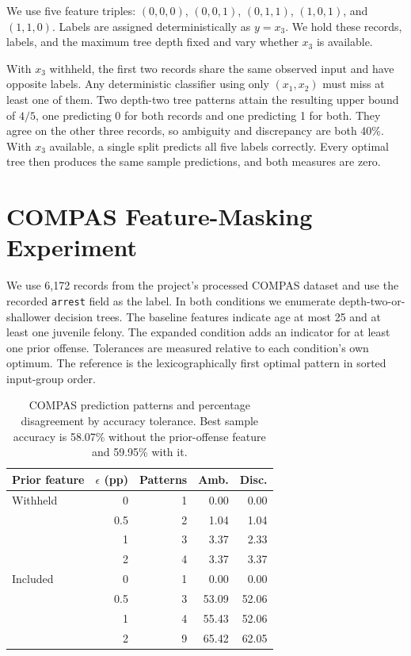 \documentclass{article}
\begin{document}
We use five feature triples: \((0,0,0)\), \((0,0,1)\), \((0,1,1)\), \((1,0,1)\), and \((1,1,0)\). Labels are assigned deterministically as \(y=x_3\). We hold these records, labels, and the maximum tree depth fixed and vary whether \(x_3\) is available.

With \(x_3\) withheld, the first two records share the same observed input and have opposite labels. Any deterministic classifier using only \((x_1,x_2)\) must miss at least one of them. Two depth-two tree patterns attain the resulting upper bound of \(4/5\), one predicting 0 for both records and one predicting 1 for both. They agree on the other three records, so ambiguity and discrepancy are both 40\%. With \(x_3\) available, a single split predicts all five labels correctly. Every optimal tree then produces the same sample predictions, and both measures are zero.

\section{COMPAS Feature-Masking Experiment}

We use 6,172 records from the project's processed COMPAS dataset and use the recorded \texttt{arrest} field as the label. In both conditions we enumerate depth-two-or-shallower decision trees. The baseline features indicate age at most 25 and at least one juvenile felony. The expanded condition adds an indicator for at least one prior offense. Tolerances are measured relative to each condition's own optimum. The reference is the lexicographically first optimal pattern in sorted input-group order.

\begin{table}[t]
\centering
\caption{COMPAS prediction patterns and percentage disagreement by accuracy tolerance. Best sample accuracy is 58.07\% without the prior-offense feature and 59.95\% with it.}
\label{tab:compas}
\small
\begin{tabular}{@{}lrrrr@{}}
\toprule
Prior feature & \(\epsilon\) (pp) & Patterns & Amb. & Disc.\\
\midrule
Withheld & 0   & 1 & 0.00 & 0.00\\
         & 0.5 & 2 & 1.04 & 1.04\\
         & 1   & 3 & 3.37 & 2.33\\
         & 2   & 4 & 3.37 & 3.37\\
\midrule
Included & 0   & 1 & 0.00 & 0.00\\
         & 0.5 & 3 & 53.09 & 52.06\\
         & 1   & 4 & 55.43 & 52.06\\
         & 2   & 9 & 65.42 & 62.05\\
\bottomrule
\end{tabular}
\end{table}
\end{document}

